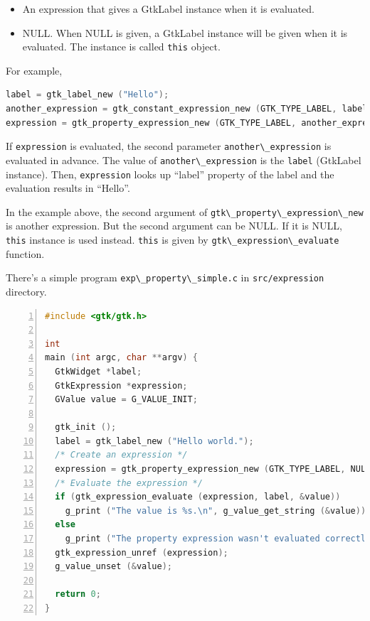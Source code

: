 \begin{itemize}
\tightlist
\item
  An expression that gives a GtkLabel instance when it is evaluated.
\item
  NULL. When NULL is given, a GtkLabel instance will be given when it is
  evaluated. The instance is called \passthrough{\lstinline!this!}
  object.
\end{itemize}

For example,

\begin{lstlisting}[language=C]
label = gtk_label_new ("Hello");
another_expression = gtk_constant_expression_new (GTK_TYPE_LABEL, label);
expression = gtk_property_expression_new (GTK_TYPE_LABEL, another_expression, "label");
\end{lstlisting}

If \passthrough{\lstinline!expression!} is evaluated, the second
parameter \passthrough{\lstinline!another\_expression!} is evaluated in
advance. The value of \passthrough{\lstinline!another\_expression!} is
the \passthrough{\lstinline!label!} (GtkLabel instance). Then,
\passthrough{\lstinline!expression!} looks up ``label'' property of the
label and the evaluation results in ``Hello''.

In the example above, the second argument of
\passthrough{\lstinline!gtk\_property\_expression\_new!} is another
expression. But the second argument can be NULL. If it is NULL,
\passthrough{\lstinline!this!} instance is used instead.
\passthrough{\lstinline!this!} is given by
\passthrough{\lstinline!gtk\_expression\_evaluate!} function.

There's a simple program
\passthrough{\lstinline!exp\_property\_simple.c!} in
\passthrough{\lstinline!src/expression!} directory.

\begin{lstlisting}[language=C, numbers=left]
#include <gtk/gtk.h>

int
main (int argc, char **argv) {
  GtkWidget *label;
  GtkExpression *expression;
  GValue value = G_VALUE_INIT;

  gtk_init ();
  label = gtk_label_new ("Hello world.");
  /* Create an expression */
  expression = gtk_property_expression_new (GTK_TYPE_LABEL, NULL, "label");
  /* Evaluate the expression */
  if (gtk_expression_evaluate (expression, label, &value))
    g_print ("The value is %s.\n", g_value_get_string (&value));
  else
    g_print ("The property expression wasn't evaluated correctly.\n");
  gtk_expression_unref (expression);
  g_value_unset (&value);

  return 0;
}
\end{lstlisting}

